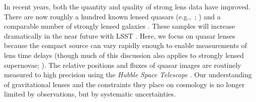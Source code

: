 In recent years, both the quantity and quality of strong lens data have improved. There are now roughly a hundred known lensed quasars (e.g.,\ ; \citealt{SQLS,CLASS}) and a comparable number of strongly lensed galaxies \citep[e.g.,][]{Bolton08,Cassowary}. These samples will increase dramatically in the near future with LSST \citep[e.g.,][]{LSST, Coe09, Oguri10, Collett15}. Here, we focus on quasar lenses because the compact source can vary rapidly enough to enable measurements of lens time delays (though much of this discussion also applies to strongly lensed supernovae; \citealt{Kelly15}). The relative positions and fluxes of quasar images are routinely measured to high precision using the \textit{Hubble Space Telescope} \citep[e.g,.][and references therein; CASTLeS Collaboration]{Lehar00,Sluse12}. Our understanding of gravitational lenses and the constraints they place on cosmology is no longer limited by observations, but by systematic uncertainties. 
  
  
  